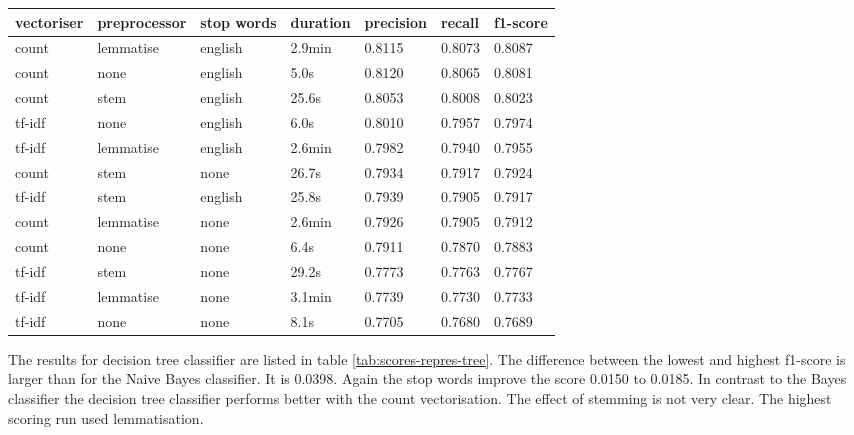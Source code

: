 \documentclass[11pt]{article}
\begin{document}
\begin{table*}[h]\footnotesize
\centering
\label{tab:scores-repres-tree}
\begin{tabular}{ l l l l l l l }
vectoriser & preprocessor & stop words & duration & precision & recall & f1-score \\
\hline
count & lemmatise & english & 2.9min & 0.8115 & 0.8073 & 0.8087 \\
count & none & english & 5.0s & 0.8120 & 0.8065 & 0.8081 \\
count & stem & english & 25.6s & 0.8053 & 0.8008 & 0.8023 \\
tf-idf & none & english & 6.0s & 0.8010 & 0.7957 & 0.7974 \\
tf-idf & lemmatise & english & 2.6min &  0.7982 & 0.7940 & 0.7955 \\
count & stem & none & 26.7s & 0.7934 & 0.7917 & 0.7924 \\
tf-idf & stem & english & 25.8s & 0.7939 & 0.7905 & 0.7917 \\
count & lemmatise & none & 2.6min & 0.7926 & 0.7905 & 0.7912 \\
count & none & none & 6.4s & 0.7911 & 0.7870 & 0.7883 \\
tf-idf & stem & none & 29.2s & 0.7773 & 0.7763 & 0.7767 \\
tf-idf & lemmatise & none & 3.1min & 0.7739 & 0.7730 & 0.7733 \\
tf-idf & none & none & 8.1s & 0.7705 & 0.7680  & 0.7689 \\
\end{tabular}
\caption{scores for different representations and the decision tree classifier sorted by f1-score}
\end{table*}

The results for decision tree classifier are listed in table \ref{tab:scores-repres-tree}. The difference between the lowest and highest f1-score is larger than for the Naive Bayes classifier. It is 0.0398. Again the stop words improve the score 0.0150 to 0.0185. In contrast to the Bayes classifier the decision tree classifier performs better with the count vectorisation. The effect of stemming is not very clear. The highest scoring run used lemmatisation.
\end{document}
